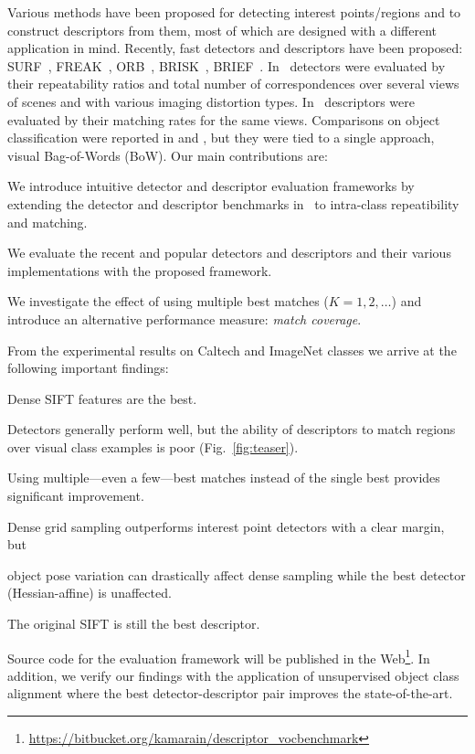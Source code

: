 \documentclass[10pt,journal,cspaper,compsoc]{IEEEtran}
\begin{document}
Various methods have been proposed for detecting interest
points/regions and to construct descriptors from them,
most of which are designed with a different application in mind.
Recently, fast detectors and descriptors have been
proposed: SURF~\cite{BayEssTuy:2008},
FREAK~\cite{freak}, ORB~\cite{orb}, BRISK~\cite{brisk},
BRIEF~\cite{brief}. In~\cite{MikTuySch:2005} detectors
were evaluated by their repeatability ratios and total number of 
correspondences over several views of scenes and with various
imaging distortion types.
In~\cite{MikSch:2005}
descriptors were evaluated by their matching
rates for the same views. Comparisons on object classification
were
reported in \cite{ZhaMarLaz:2006} and
\cite{MikLeiSch:2005}, but they were tied to a single approach,
visual Bag-of-Words (BoW).
Our main contributions are:
\begin{compactitem}
\item We introduce intuitive detector and descriptor evaluation frameworks
by extending the detector and descriptor benchmarks
in~\cite{MikTuySch:2005,MikSch:2005} to intra-class
repeatibility and matching.
\item We evaluate the recent and popular detectors and descriptors and their various 
  implementations with the proposed framework.
\item We investigate the effect of using multiple best matches ($K=1,2,\ldots$) and
  introduce an alternative performance measure: {\em match coverage}.
\end{compactitem}
From the experimental results on Caltech and ImageNet classes we
arrive at the following important findings:
\begin{compactitem}
\item Dense SIFT features are the best.
\item Detectors generally perform well, but the ability of descriptors to match
  regions over visual class examples is poor (Fig.~\ref{fig:teaser}).
\item Using multiple---even a few---best matches instead of the single best
  provides significant improvement.
\item Dense grid sampling outperforms interest point detectors with a clear margin, but
\item object pose variation can drastically affect dense sampling
  while the best detector (Hessian-affine) is unaffected.
\item The original SIFT is still the best descriptor. %
\end{compactitem}
Source code for the evaluation framework will be published in the
Web\footnote{\url{https://bitbucket.org/kamarain/descriptor_vocbenchmark}}. In addition, we verify our findings with the application of unsupervised
object class alignment where the best detector-descriptor pair
improves the state-of-the-art.
\end{document}
